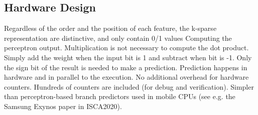 \subsection{Hardware Design}
Regardless of the order
and the position of each feature, the k-sparse representation
are distinctive, and only contain 0/1 values
 Computing the perceptron output. Multiplication is not necessary to compute the dot product. Simply add the weight when the input bit is 1 and subtract when bit is -1. Only the sign bit of the result is needed to make a prediction. Prediction happens in hardware and in parallel to the execution.
No additional overhead for hardware counters. Hundreds of counters are included (for debug and verification). Simpler than perceptron-based branch predictors used in mobile CPUs (see e.g. the Samsung Exynos paper in ISCA2020).
